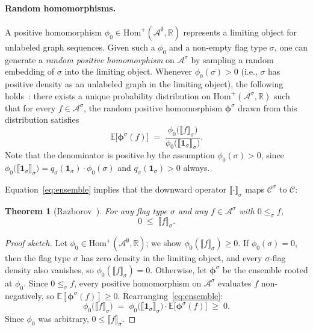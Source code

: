 \documentclass{article}
\newtheorem{theorem}{Theorem}[section]
\newcommand{\poshom}[1]{\mathrm{Hom}^+(\mathcal{A}^{#1}, \mathbb{R})}
\begin{document}
\paragraph{Random homomorphisms.}
A positive homomorphism $\phi_0 \in \poshom{\emptyset}$ represents a limiting
object for unlabeled graph sequences.  Given such a $\phi_0$ and a non-empty
flag type $\sigma$, one can generate a \emph{random positive homomorphism} on
$\mathcal{A}^\sigma$ by sampling a random embedding of $\sigma$ into the
limiting object.
Whenever $\phi_0(\sigma) > 0$ (i.e., $\sigma$ has positive density as an unlabeled graph in the limiting object),
the following holds~\cite{razborov2007flag}:
there exists a unique probability distribution on $\poshom{\sigma}$ such that for every $f \in \mathcal{A}^\sigma$, the random positive
homomorphism $\boldsymbol{\phi}^\sigma$ drawn from this distribution satisfies
\begin{equation}\label{eq:ensemble}
  \mathbb{E}\bigl[\boldsymbol{\phi}^\sigma(f)\bigr]
  \;=\;
  \frac{\phi_0\bigl(\llbracket f \rrbracket_\sigma\bigr)}
       {\phi_0\bigl(\llbracket \mathbf{1}_\sigma \rrbracket_\sigma\bigr)}.
\end{equation}
Note that the denominator is positive by the assumption $\phi_0(\sigma) > 0$, since
$\phi_0\bigl(\llbracket \mathbf{1}_\sigma \rrbracket_\sigma\bigr) = q_\sigma(\mathbf{1}_\sigma)\cdot\phi_0(\sigma)$
and $q_\sigma(\mathbf{1}_\sigma) > 0$ always.

Equation~\eqref{eq:ensemble} implies that the downward operator $\llbracket \cdot \rrbracket_\sigma$ maps $\mathcal{C}^\sigma$ to $\mathcal{C}$:

\begin{theorem}[Razborov~{\cite{razborov2007flag}}]\label{thm:downward-nonneg}
  For any flag type $\sigma$ and any $f \in \mathcal{A}^\sigma$ with $0 \leq_\sigma f$,
  \[
    0 \;\leq\; \llbracket f \rrbracket_\sigma.
  \]
\end{theorem}
\begin{proof}[Proof sketch]
  Let $\phi_0 \in \poshom{\emptyset}$; we show $\phi_0(\llbracket f \rrbracket_\sigma) \geq 0$.
  If $\phi_0(\sigma) = 0$, then the flag type $\sigma$ has zero density in the limiting object, and every $\sigma$-flag density also
  vanishes, so $\phi_0(\llbracket f \rrbracket_\sigma) = 0$.
  Otherwise, let $\boldsymbol{\phi}^\sigma$ be the ensemble rooted at $\phi_0$.
  Since $0 \leq_\sigma f$, every positive homomorphism on
  $\mathcal{A}^\sigma$ evaluates $f$ non-negatively, so
  $\mathbb{E}[\boldsymbol{\phi}^\sigma(f)] \geq 0$.
  Rearranging~\eqref{eq:ensemble}:
  \[
    \phi_0\bigl(\llbracket f \rrbracket_\sigma\bigr)
    \;=\;
    \phi_0\bigl(\llbracket \mathbf{1}_\sigma \rrbracket_\sigma\bigr)
    \cdot
    \mathbb{E}\bigl[\boldsymbol{\phi}^\sigma(f)\bigr]
    \;\geq\; 0.
  \]
  Since $\phi_0$ was arbitrary, $0 \leq \llbracket f \rrbracket_\sigma$.
\end{proof}
\end{document}
